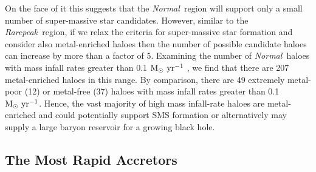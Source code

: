 \documentclass[graphics, twocolumn, usenatbib]{mn2e}
\newcommand{\msolaryr} {$\rm{M_{\odot}~yr^{-1}}~$}
\newcommand{\msolaryrc} {$\rm{M_{\odot}~yr^{-1}}$}
\newcommand{\rarepeak} {\textit{Rarepeak~}}
\newcommand{\normal} {\textit{Normal~}}
\begin{document}
On the face of it this suggests that the \normal region will
support only a small number of super-massive star candidates. However, similar to the \rarepeak region,
if we relax the criteria for super-massive star formation and consider also metal-enriched haloes
then the number of possible candidate haloes can increase by more than a factor of 5.
Examining the number of \normal haloes with mass infall rates greater than 0.1 \msolaryr, we find that there are 207 metal-enriched haloes in this range.
By comparison, there are 49 extremely metal-poor (12) or metal-free (37) haloes with mass infall rates  greater than 0.1 \msolaryrc. Hence, the vast majority of high mass infall-rate haloes are metal-enriched and could potentially support SMS formation or 
alternatively may supply a large baryon reservoir for a growing black hole. 


\subsection{The Most Rapid Accretors}
\end{document}
